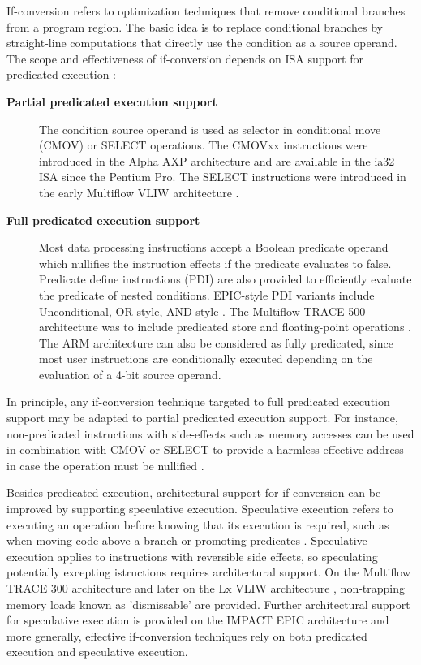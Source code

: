 If-conversion refers to optimization techniques that remove conditional branches
from a program region. The basic idea is to replace conditional branches by
straight-line computations that directly use the condition as a source operand.
The scope and effectiveness of if-conversion depends on ISA support for predicated
execution \cite{Mahlke:1995:ISCA}: \begin{description}


\item[\bf Partial predicated execution support] The condition source operand is used
as selector in conditional move (CMOV) or SELECT operations. The CMOVxx
instructions were introduced in the Alpha AXP architecture
\cite{Blickstein:1992:DTJ} and are available in the ia32 ISA since the Pentium Pro.
The SELECT instructions were introduced in the early Multiflow VLIW architecture
\cite{Colwell:1987:ASPLOS}.

\item[\bf Full predicated execution support] Most data processing instructions
accept a Boolean predicate operand which nullifies the instruction effects if the
predicate evaluates to false. Predicate define instructions (PDI) are also
provided to efficiently evaluate the predicate of nested conditions. EPIC-style PDI
variants include Unconditional, OR-style, AND-style \cite{Mahlke:1995:ISCA}.
The Multiflow TRACE 500 architecture was to include predicated store and
floating-point operations \cite{Lowney:1993:JS}.
The ARM architecture can also be considered as fully predicated, since most user
instructions are conditionally executed depending on the evaluation of a 4-bit
source operand.

\end{description} In principle, any if-conversion technique targeted to full
predicated execution support may be adapted to partial predicated execution
support. For instance, non-predicated instructions with side-effects such as
memory accesses can be used in combination with CMOV or SELECT to provide a
harmless effective address in case the operation must be nullified
\cite{Mahlke:1995:ISCA}.

Besides predicated execution, architectural support for if-conversion can be
improved by supporting speculative execution. Speculative execution refers to
executing an operation before knowing that its execution is required, such as
when moving code above a branch \cite{Lowney:1993:JS} or promoting predicates
\cite{Mahlke:1995:ISCA}.  Speculative execution applies to instructions with
reversible side effects, so speculating potentially excepting istructions
requires architectural support. On the Multiflow TRACE 300 architecture and
later on the Lx VLIW architecture \cite{Faraboschi:2000:ISCA}, non-trapping
memory loads known as 'dismissable' are provided. Further architectural support
for speculative execution is provided on the IMPACT EPIC architecture
\cite{August:1998:ISCA} and more generally, effective if-conversion techniques
rely on both predicated execution and speculative execution.

